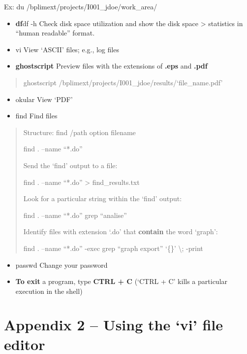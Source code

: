 \documentclass[]{book}
\begin{document}
Ex: du /bplimext/projects/I001\_jdoe/work\_area/

\begin{itemize}
\item
  \textbf{df}df -h Check disk space utilization and show the disk space
  \textgreater{} statistics in ``human readable'' format.
\item
  vi View `ASCII' files; e.g., log files
\item
  \textbf{ghostscript} Preview files with the extensions of \textbf{.eps} and
  \textbf{.pdf}
\end{itemize}

\begin{quote}
ghostscript /bplimext/projects/I001\_jdoe/results/`file\_name.pdf'
\end{quote}

\begin{itemize}
\item
  okular View `PDF'
\item
  find Find files
\end{itemize}

\begin{quote}
Structure: find /path option filename

find . --name ``*.do''

Send the `find' output to a file:

find . --name ``*.do'' \textgreater{} find\_results.txt

Look for a particular string within the `find' output:

find . --name ``*.do'' \textbar{} grep ``analise''

Identify files with extension `.do' that \textbf{contain} the word `graph':

find . --name ``*.do'' -exec grep ``graph export'' `\{\}' \textbackslash{}; -print
\end{quote}

\begin{itemize}
\item
  passwd Change your password
\item
  \textbf{To exit} a program, type \textbf{CTRL + C} (`CTRL + C' kills a particular
  execution in the shell)
\end{itemize}

\hypertarget{appendix-2-using-the-vi-file-editor}{%
\section{\texorpdfstring{{Appendix 2 -- Using the `vi' file editor}}{Appendix 2 -- Using the `vi' file editor}}\label{appendix-2-using-the-vi-file-editor}}
\end{document}
